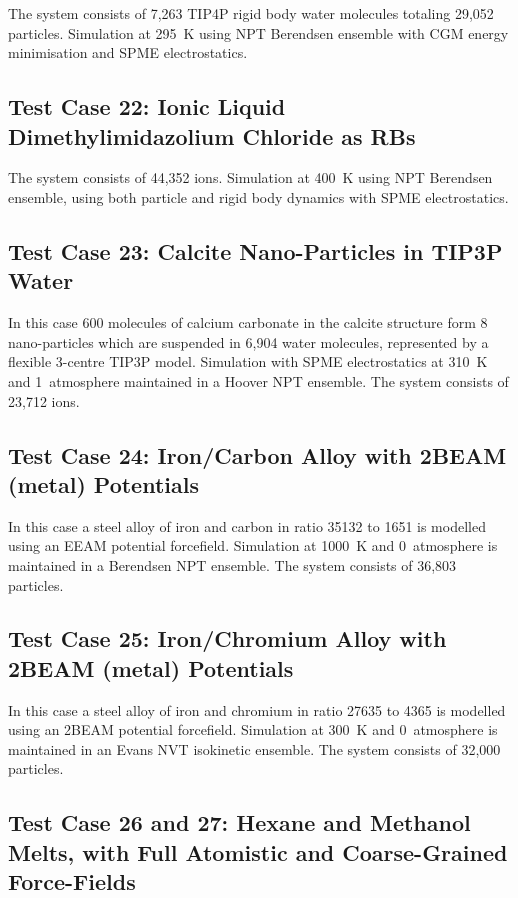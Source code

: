 The system consists of 7,263 TIP4P rigid body water molecules totaling
29,052 particles.  Simulation at 295~K using NPT Berendsen ensemble with
CGM energy minimisation and SPME electrostatics.

\subsection{Test Case 22: Ionic Liquid Dimethylimidazolium Chloride as RBs}

The system consists of 44,352 ions.  Simulation at 400~K using NPT
Berendsen ensemble, using both particle and rigid body dynamics with SPME electrostatics.

\subsection{Test Case 23: Calcite Nano-Particles in TIP3P Water}

In this case 600 molecules of calcium carbonate in the calcite
structure form 8 nano-particles which are suspended in 6,904 water
molecules, represented by a flexible 3-centre TIP3P model.  Simulation
with SPME electrostatics at 310~K and 1~atmosphere maintained in
a Hoover NPT ensemble.  The system consists of 23,712 ions.

\subsection{Test Case 24: Iron/Carbon Alloy with 2BEAM (metal) Potentials}

In this case a steel alloy of iron and carbon in ratio
35132 to 1651 is modelled using an EEAM potential forcefield.
Simulation at 1000~K and 0~atmosphere is maintained in a
Berendsen NPT ensemble.  The system consists of 36,803 particles.

\subsection{Test Case 25: Iron/Chromium Alloy with 2BEAM (metal) Potentials}

In this case a steel alloy of iron and chromium in ratio
27635 to 4365 is modelled using an 2BEAM potential forcefield.
Simulation at 300~K and 0~atmosphere is maintained in an Evans NVT
isokinetic ensemble.  The system consists of 32,000 particles.

\subsection{Test Case 26 and 27: Hexane and Methanol Melts, with
Full Atomistic and Coarse-Grained Force-Fields}

